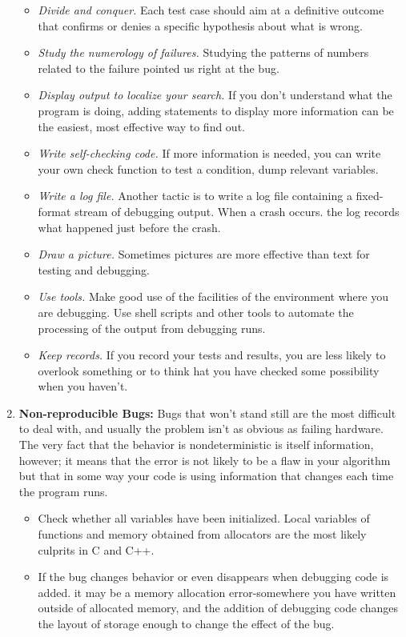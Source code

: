 \documentclass[draftclsnofoot,journal,onecolumn,12pt]{IEEEtran}
\begin{document}
\begin{enumerate}
\begin{itemize}
    \item \textit{Divide and conquer.} Each test case should aim at a definitive outcome that confirms or denies a specific hypothesis about what is wrong.
    \item \textit{Study the numerology of failures.} Studying the patterns of numbers related to the failure pointed us right at the bug.
    \item \textit{Display output to localize your search.} If you don't understand what the program is doing, adding statements to display more information can be the easiest, most effective way to find out.
    \item \textit{Write self-checking code.} If more information is needed, you can write your own check function to test a condition, dump relevant variables.
    \item \textit{Write a log file.} Another tactic is to write a log file containing a fixed-format stream of debugging output. When a crash occurs. the log records what happened just before the crash.
    \item \textit{Draw a picture.} Sometimes pictures are more effective than text for testing and debugging.
    \item \textit{Use tools.} Make good use of the facilities of the environment where you are debugging. Use shell scripts and other tools to automate the processing of the output from debugging runs.
    \item \textit{Keep records.} If you record your tests and results, you are less likely to overlook something or to think hat you have checked some possibility when you haven't.
    \end{itemize}
  \item \textbf{Non-reproducible Bugs:} Bugs that won't stand still are the most difficult to deal with, and usually the problem isn't as obvious as failing hardware. The very fact that the behavior is nondeterministic is itself information, however; it means that the error is not likely to be a flaw in your algorithm but that in some way your code is using information that changes each time the program runs.
      \begin{itemize}
        \item Check whether all variables have been initialized. Local variables of functions and memory obtained from allocators are the most likely culprits in C and C++.
        \item If the bug changes behavior or even disappears when debugging code is added. it may be a memory allocation error-somewhere you have written outside of allocated memory, and the addition of debugging code changes the layout of storage enough to change the effect of the bug.

\end{itemize}
\end{enumerate}
\end{document}
